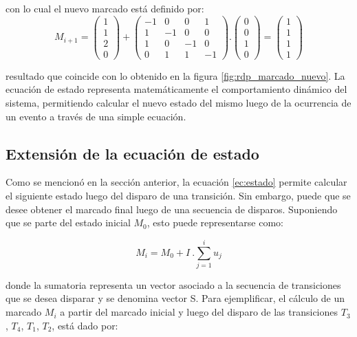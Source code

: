 \noindent con lo cual el nuevo marcado está definido por:
\begin{equation}
    M_{i+1} = 
    \begin{pmatrix}
        1 \\
        1 \\
        2 \\
        0
    \end{pmatrix}
    +
    \begin{pmatrix}
        -1 & 0 & 0 & 1 \\
        1 & -1 & 0 & 0 \\
        1 & 0 & -1 & 0 \\
        0 & 1 & 1 & -1 
    \end{pmatrix}
    .
    \begin{pmatrix}
        0 \\
        0 \\
        1 \\
        0
    \end{pmatrix}
    =
    \begin{pmatrix}
        1 \\
        1 \\
        1 \\
        1
    \end{pmatrix}    
\end{equation}

\noindent resultado que coincide con lo obtenido en la figura \ref{fig:rdp_marcado_nuevo}. La ecuación de estado representa matemáticamente el comportamiento dinámico del sistema, permitiendo calcular el nuevo estado del mismo luego de la ocurrencia de un evento a través de una simple ecuación.

\subsection{Extensión de la ecuación de estado}
Como se mencionó en la sección anterior, la ecuación \ref{ec:estado} permite calcular el siguiente estado luego del disparo de una transición. Sin embargo, puede que se desee obtener el marcado final luego de una secuencia de disparos. Suponiendo que se parte del estado inicial $M_0$, esto puede representarse como:

\begin{equation}
    M_i = M_0 + I \ . \sum_{j=1}^i u_j
\end{equation}

\noindent donde la sumatoria representa un vector asociado a la secuencia de transiciones que se desea disparar y se denomina vector S. Para ejemplificar, el cálculo de un marcado $M_i$ a partir del marcado inicial y luego del disparo de las transiciones {$T_3$, $T_4$, $T_1$, $T_2$,} está dado por:

